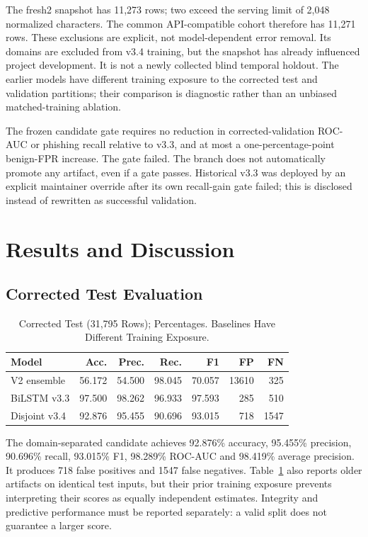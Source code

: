 \documentclass[conference,a4paper]{IEEEtran}
\begin{document}
The fresh2 snapshot has 11,273 rows; two exceed the serving limit of 2,048 normalized characters. The common API-compatible cohort therefore has 11,271 rows. These exclusions are explicit, not model-dependent error removal. Its domains are excluded from v3.4 training, but the snapshot has already influenced project development. It is not a newly collected blind temporal holdout. The earlier models have different training exposure to the corrected test and validation partitions; their comparison is diagnostic rather than an unbiased matched-training ablation.

The frozen candidate gate requires no reduction in corrected-validation ROC-AUC or phishing recall relative to v3.3, and at most a one-percentage-point benign-FPR increase. The gate failed. The branch does not automatically promote any artifact, even if a gate passes. Historical v3.3 was deployed by an explicit maintainer override after its own recall-gain gate failed; this is disclosed instead of rewritten as successful validation.

\section{Results and Discussion}
\subsection{Corrected Test Evaluation}
\begin{table}[t]\centering\small
\caption{Corrected Test (31,795 Rows); Percentages. Baselines Have Different Training Exposure.}\label{tab:test}
\setlength{\tabcolsep}{3pt}\begin{tabular}{lrrrrrr}\toprule
Model & Acc. & Prec. & Rec. & F1 & FP & FN\\\midrule
V2 ensemble & 56.172 & 54.500 & 98.045 & 70.057 & 13610 & 325\\
BiLSTM v3.3 & 97.500 & 98.262 & 96.933 & 97.593 & 285 & 510\\
Disjoint v3.4 & 92.876 & 95.455 & 90.696 & 93.015 & 718 & 1547\\
\bottomrule\end{tabular}\end{table}
The domain-separated candidate achieves 92.876\% accuracy, 95.455\% precision, 90.696\% recall, 93.015\% F1, 98.289\% ROC-AUC and 98.419\% average precision. It produces 718 false positives and 1547 false negatives. Table~\ref{tab:test} also reports older artifacts on identical test inputs, but their prior training exposure prevents interpreting their scores as equally independent estimates. Integrity and predictive performance must be reported separately: a valid split does not guarantee a larger score.
\end{document}
